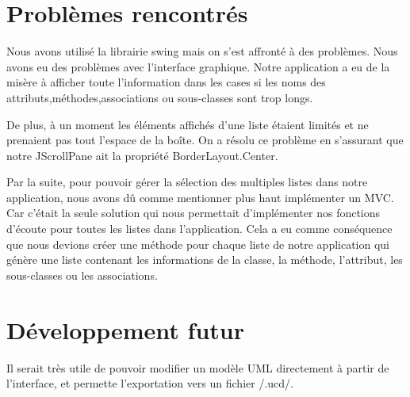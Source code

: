 \documentclass[letter,french]{report}
\begin{document}
	
	
	
	
	\section*{Problèmes rencontrés}
Nous avons utilisé la librairie swing mais on s'est affronté à des problèmes. Nous avons eu des problèmes avec l'interface graphique. Notre application a eu de la misère à afficher toute l'information dans les cases si les noms des attributs,méthodes,associations ou sous-classes sont trop longs.

De plus, à un moment les éléments affichés d'une liste étaient limités et ne prenaient pas tout l'espace de la boîte. On a résolu ce problème en s'assurant que notre JScrollPane ait la propriété BorderLayout.Center.  

Par la suite, pour pouvoir gérer la sélection des multiples listes dans notre application, nous avons dû comme mentionner plus haut implémenter un MVC. Car c'était la seule solution qui nous permettait d'implémenter nos fonctions d'écoute pour toutes les listes dans l'application. Cela a eu comme conséquence que nous devions créer une méthode pour chaque liste de notre application qui génère une liste contenant les informations de la classe, la méthode, l'attribut, les sous-classes ou les associations.         

   
	
	
	
	\section*{Développement futur}
	Il serait très utile de pouvoir modifier un modèle UML directement à partir de l'interface,
	et permette l'exportation vers un fichier /.ucd/.
	
	
	
	
\end{document}
